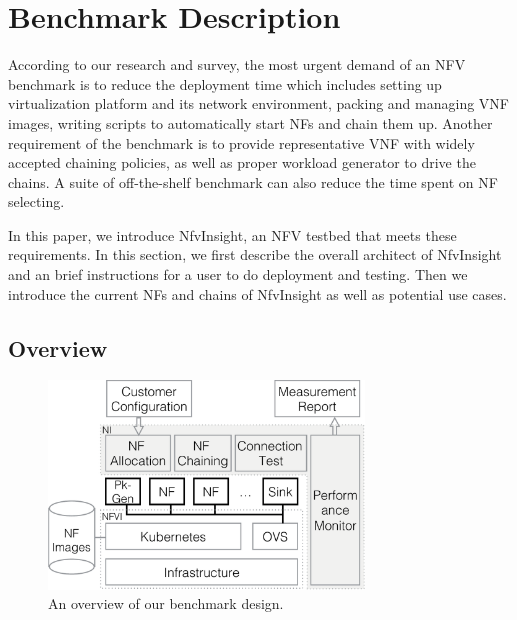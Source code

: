\section{Benchmark Description}

According to our research and survey,
the most urgent demand of an NFV benchmark is
to reduce the deployment time which includes
setting up virtualization platform and its network environment,
packing and managing VNF images,
writing scripts to automatically start NFs and chain them up.
Another requirement of the benchmark is to provide
representative VNF with widely accepted chaining policies,
as well as proper workload generator to drive the chains.
A suite of off-the-shelf benchmark can also
reduce the time spent on NF selecting.

In this paper, we introduce NfvInsight, an NFV testbed that meets these
requirements.
In this section, we first describe the overall architect of NfvInsight
and an brief instructions for a user to do deployment and testing.
Then we introduce the current NFs and chains of NfvInsight as well as
potential use cases.

%

%
%
%

\subsection{Overview}

\begin{figure}[!t]
\centering
\includegraphics[width=3.3in]{fig/design2.pdf}
\caption{An overview of our benchmark design.}
\label{design}
\end{figure}

